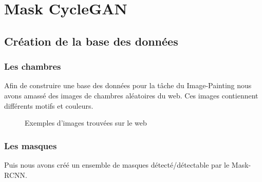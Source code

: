 \chapter{Mask CycleGAN}

\section{Création de la base des données}

\subsection{Les chambres}

Afin de construire une base des données pour la tâche du Image-Painting nous avons amassé des images de chambres aléatoires du web. Ces images contiennent différents motifs et couleurs. 

\begin{figure}[!h]
    \centering
    \qquad
    \caption{Exemples d'images trouvées sur le web}%
    \label{fig:example}%
\end{figure}

\subsection{Les masques}
Puis nous avons créé un ensemble de masques détecté/détectable par le Mask-RCNN.

